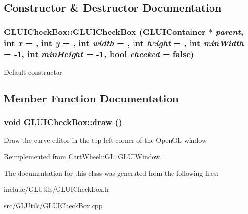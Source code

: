 \subsection{Constructor \& Destructor Documentation}
\hypertarget{classCartWheel_1_1GL_1_1GLUICheckBox_ac011fb61a8befd7dae805328dbecc977}{
\subsubsection[{GLUICheckBox}]{\setlength{\rightskip}{0pt plus 5cm}GLUICheckBox::GLUICheckBox ({\bf GLUIContainer} $\ast$ {\em parent}, \/  int {\em x} = {}, \/  int {\em y} = {}, \/  int {\em width} = {}, \/  int {\em height} = {}, \/  int {\em minWidth} = {\ttfamily -\/1}, \/  int {\em minHeight} = {\ttfamily -\/1}, \/  bool {\em checked} = {\ttfamily false})}}
\label{classCartWheel_1_1GL_1_1GLUICheckBox_ac011fb61a8befd7dae805328dbecc977}
Default constructor 

\subsection{Member Function Documentation}
\hypertarget{classCartWheel_1_1GL_1_1GLUICheckBox_a4bb77220bc4127503de50f2af0528125}{
\subsubsection[{draw}]{\setlength{\rightskip}{0pt plus 5cm}void GLUICheckBox::draw ()}}
\label{classCartWheel_1_1GL_1_1GLUICheckBox_a4bb77220bc4127503de50f2af0528125}
Draw the curve editor in the top-\/left corner of the OpenGL window 

Reimplemented from \hyperlink{classCartWheel_1_1GL_1_1GLUIWindow}{CartWheel::GL::GLUIWindow}.



The documentation for this class was generated from the following files:\begin{DoxyCompactItemize}
\item 
include/GLUtils/GLUICheckBox.h\item 
src/GLUtils/GLUICheckBox.cpp\end{DoxyCompactItemize}
